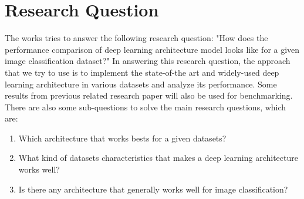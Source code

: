 





\section{Research Question}
The works tries to answer the following research question:
"How does the performance comparison of deep learning architecture model looks like for a given image classification dataset?"
In answering this research question, the approach that we try to use is to implement the state-of-the art and widely-used deep learning architecture in various datasets and analyze its performance. Some results from previous related research paper will also be used for benchmarking. There are also some sub-questions to solve the main research questions, which are:
\begin{enumerate}
	\item Which architecture that works bests for a given datasets?
	\item What kind of datasets characteristics that makes a deep learning architecture works well?
	\item Is there any architecture that generally works well for image classification?	
\end{enumerate}

